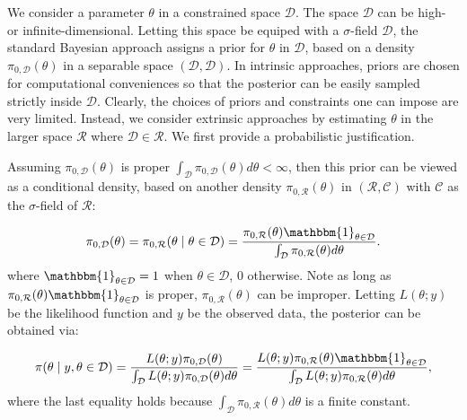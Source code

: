 \documentclass[10pt]{article}
\newcommand{\mc}[1]{\mathcal{#1}}
\DeclareMathOperator{\1}{\mathbbm{1}}
\begin{document}
We consider a parameter $\theta$ in a constrained space $\mc D$. The space $\mc D$ can be high- or infinite-dimensional. Letting this space be equiped with a $\sigma$-field $\mathscr D$, the standard Bayesian approach assigns a prior for $\theta$ in $\mc D$, based on a density $\pi_{0,\mc D}(\theta)$ in a separable space $(\mc D, \mathscr D)$. In intrinsic approaches, priors are chosen for computational conveniences so that the posterior can be easily sampled strictly inside $\mc D$. Clearly, the choices of priors and constraints one can impose are very limited. Instead, we consider extrinsic approaches by estimating $\theta$ in the larger space $\mc R$ where $\mc D\in \mc R$. We first provide a probabilistic justification.


Assuming $\pi_{0,\mc D}(\theta)$ is proper $\int_{\mc D} \pi_{0,\mc D}(\theta) d\theta <\infty$, then this prior can be viewed as a conditional density, based on another density $\pi_{0,\mc R}(\theta)$ in $(\mc R, \mathscr C)$ with $\mathscr C$ as the $\sigma$-field of $\mc R$:

\begin{equation}
\begin{aligned}
\pi_{0,\mc D}(\theta)= \pi_{0,\mc R}(\theta \mid \theta \in \mc D) = \frac{ \pi_{0,\mc R}(\theta) \mathbbm{1}_{\theta\in \mc D} }{ \int_{\mc D}  \pi_{0,\mc R}(\theta)d\theta }.
\end{aligned}
\end{equation}
where $\mathbbm{1}_{\theta \in \mc D}=1$ when $\theta \in \mc D$, $0$ otherwise. Note  as long as $\pi_{0,\mc R}(\theta) \mathbbm{1}_{\theta\in \mc D}$ is proper, $\pi_{0,\mc R}(\theta)$ can be improper. Letting $L(\theta;y)$ be the likelihood function and $y$ be the observed data, the posterior can be obtained via:

\begin{equation}
\begin{aligned}
\label{exact_posterior}
\pi(\theta \mid y, \theta \in \mc D) = \frac{ L(\theta;y)\pi_{0,\mc D}(\theta)}{\int_{\mc D} L(\theta;y)\pi_{0,\mc D}(\theta) d\theta } = \frac{ L(\theta;y)\pi_{0,\mc R}(\theta) \mathbbm{1}_{\theta\in \mc D} }{\int_{\mc D} L(\theta;y)\pi_{0,\mc R}(\theta) d\theta },
\end{aligned}
\end{equation}
where the last equality holds because $\int_{\mc D}  \pi_{0,\mc R}(\theta) d\theta$ is a finite constant.
\end{document}
